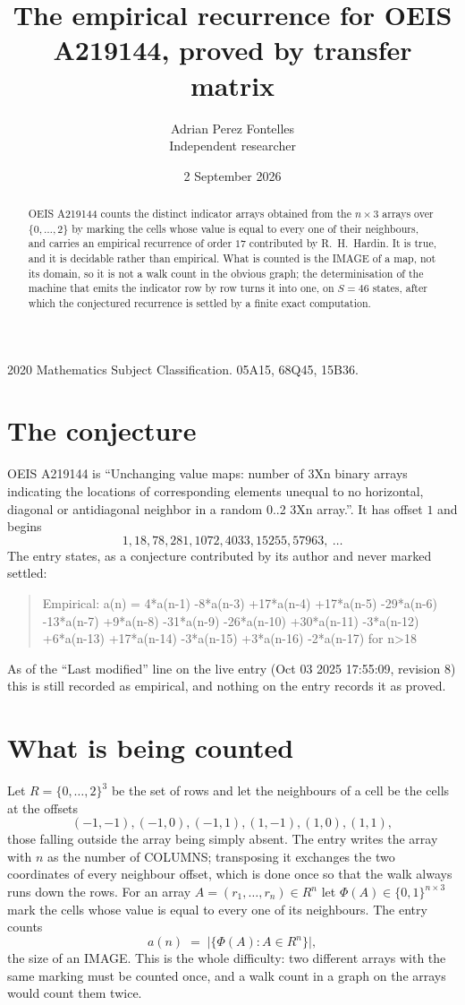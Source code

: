\documentclass[11pt,a4paper]{article}
\title{The empirical recurrence for OEIS A219144, proved by transfer matrix}
\author{Adrian Perez Fontelles\\ \small Independent researcher}
\date{2 September 2026}
\theoremstyle{plain}
\theoremstyle{definition}
\begin{document}
\maketitle

\begin{abstract}
OEIS A219144 counts the distinct indicator arrays obtained from the $n\times3$ arrays over
$\{0,\dots,2\}$ by marking the cells whose value is equal to every one of their neighbours, and carries an
empirical recurrence of order $17$ contributed by R.~H.~Hardin. It is true, and it is
decidable rather than empirical. What is counted is the IMAGE of a map, not its domain, so it
is not a walk count in the obvious graph; the determinisation of the machine that emits the
indicator row by row turns it into one, on $S=46$ states, after which the conjectured
recurrence is settled by a finite exact computation.
\end{abstract}

\noindent\small 2020 Mathematics Subject Classification. 05A15, 68Q45, 15B36.\normalsize

\section{The conjecture}

OEIS A219144 is ``Unchanging value maps: number of 3Xn binary arrays indicating the locations of corresponding elements unequal to no horizontal, diagonal or antidiagonal neighbor in a random 0..2 3Xn array.''. It has offset $1$ and begins
\[
1, 18, 78, 281, 1072, 4033, 15255, 57963,\ \dots
\]
The entry states, as a conjecture contributed by its author and never marked settled:
\begin{quote}
Empirical: a(n) = 4*a(n-1) -8*a(n-3) +17*a(n-4) +17*a(n-5) -29*a(n-6) -13*a(n-7) +9*a(n-8) -31*a(n-9) -26*a(n-10) +30*a(n-11) -3*a(n-12) +6*a(n-13) +17*a(n-14) -3*a(n-15) +3*a(n-16) -2*a(n-17) for n>18
\end{quote}
As of the ``Last modified'' line on the live entry (Oct 03 2025 17:55:09, revision 8) this is still
recorded as empirical, and nothing on the entry records it as proved.

\section{What is being counted}

Let $R=\{0,\dots,2\}^{3}$ be the set of rows and let the neighbours of a cell be the
cells at the offsets
\[
(-1,-1), (-1,0), (-1,1), (1,-1), (1,0), (1,1),
\]
those falling outside the array being simply absent. The entry writes the array with $n$ as the number of COLUMNS; transposing it exchanges the two coordinates of every neighbour offset, which is done once so that the walk always runs down the rows. For an array
$A=(r_1,\dots,r_n)\in R^n$ let $\Phi(A)\in\{0,1\}^{n\times3}$ mark the cells whose value
is equal to every one of its neighbours. The entry counts
\[
a(n)\;=\;\bigl|\{\Phi(A):A\in R^n\}\bigr| ,
\]
the size of an IMAGE. This is the whole difficulty: two different arrays with the same marking
must be counted once, and a walk count in a graph on the arrays would count them twice.
\end{document}
